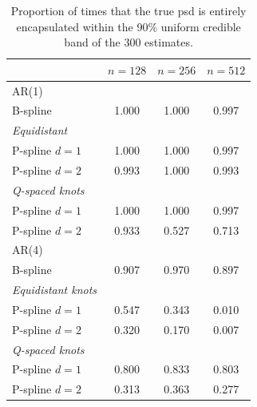 \documentclass[twocolumn,final]{svjour3}
\begin{document}
\begin{table}
	\centering
		\begin{tabular}{lccc}
			\toprule
			& $n=128$ & $n=256$ & $n=512$ \\ \hline
			AR(1)     &  &  &  \\ 
			B-spline &  1.000 & 1.000 & 0.997 \\
			\textit{Equidistant}& & &   \\
			\hspace{0.5em}P-spline $d=1$&  1.000 & 1.000 & 0.997\\
			\hspace{0.5em}P-spline $d=2$& 0.993 & 1.000 & 0.993  \\
			\textit{Q-spaced knots}& & &   \\
			\hspace{0.5em}P-spline $d=1$ & 1.000 & 1.000 & 0.997 \\
			\hspace{0.5em}P-spline $d=2$ & 0.933 & 0.527 & 0.713 \\ \hline		       
			AR(4)     &  &  &  \\ 
			B-spline &  0.907 & 0.970 & 0.897  \\
			\textit{Equidistant knots}& & &   \\
			\hspace{0.5em}P-spline $d=1$ &  0.547 & 0.343 & 0.010 \\
			\hspace{0.5em}P-spline $d=2$ & 0.320 & 0.170 & 0.007\\
			\textit{Q-spaced knots}& & &   \\	
			\hspace{0.5em}P-spline $d=1$ & 0.800 & 0.833 & 0.803 \\
			\hspace{0.5em}P-spline $d=2$ & 0.313 & 0.363 & 0.277 \\
			\bottomrule
		\end{tabular}
	\caption{Proportion of times that the true psd is entirely encapsulated within the 90\% uniform credible band of the 300 estimates.}
	\label{table:sim_covPbb}
\end{table}
\end{document}
